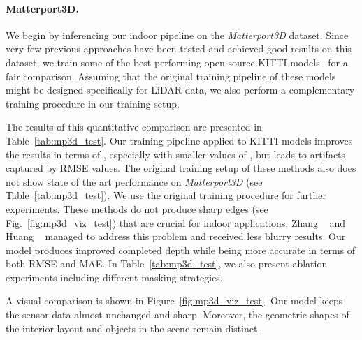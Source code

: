 \documentclass[final]{cvpr}
\begin{document}
    \paragraph{Matterport3D.} We begin by inferencing our indoor pipeline on the \emph{Matterport3D} dataset. Since very few previous approaches have been tested and achieved good results on this dataset, we train some of the best performing open-source KITTI models~\cite{msg_chn, wvangansbeke_depth_2019} for a fair comparison. Assuming that the original training pipeline of these models might be designed specifically for LiDAR data, we also perform a complementary training procedure in our training setup. 
    
    The results of this quantitative comparison are presented in Table~\ref{tab:mp3d_test}. 
Our training pipeline applied to KITTI models improves the results in terms of , especially with smaller values of , but leads to artifacts captured by RMSE values. The original training setup of these methods also does not show state of the art performance on \emph{Matterport3D} (see Table~\ref{tab:mp3d_test}). We use the original training procedure for further experiments. These methods do not produce sharp edges (see Fig.~\ref{fig:mp3d_viz_test}) that are crucial for indoor applications. Zhang \etal~\cite{DBLP:journals/corr/abs-1803-09326} and Huang \etal~\cite{Huang_2019} managed to address this problem and received less blurry results. Our model produces improved completed depth while being more accurate in terms of both RMSE and MAE. In Table~\ref{tab:mp3d_test}, we also present ablation experiments including different masking strategies.  
    
    A visual comparison is shown in Figure~\ref{fig:mp3d_viz_test}. Our model keeps the sensor data almost unchanged and sharp. 
Moreover, the geometric shapes of the interior layout and objects in the scene remain distinct.
    
\end{document}
